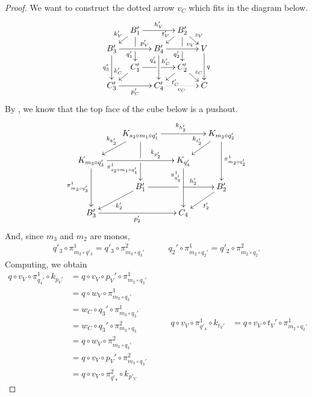 \documentclass[a4paper,UKenglish,cleveref,pdftex,thm-restate,numberwithinsect]{lipics-v2021}
\def\B{\textbf {\textup{B}}}
\begin{document}
\begin{proof}
	We want to construct the dotted arrow $v_C$ which fits in the diagram below.
	\[
	\xymatrix@C=10pt@R=6pt{
		&B_1'\ar[dd]|\hole_(.65){q_1'}\ar[rr]^{h_V'} \ar[dl]_{k_V'} && B_2' \ar[dd]|\hole_(.65){q_2'} \ar[dl]_{t_V'}\ar[dr]^{z_V}\\
		B_3'  \ar[dd]_{q_3'}\ar[rr]^(.7){p_V'} & & B_4' \ar[dd]_(.3){q_4'} \ar[rr]^(.7){v_V}&&  V\ar[dd]^{q}\\
		&C_1'\ar[rr]|\hole^(.65){h_C'} \ar[dl]_{k_C'} && C_2' \ar[dl]^{t_C'}\ar[dr]^{z_C}\\
		C'_3 \ar[rr]_{p_C'} & & C'_4\ar@{.>}[rr]_{v_C} && C
	}\]
	By , we know that the top face of the cube below is a pushout.
	\[\xymatrix@C=15pt@R=15pt{&K_{s_2\circ m_1\circ q'_1}\ar[dd]|\hole_(.65){\pi_{s_2\circ m_1\circ q'_1}^{1}}\ar[rr]^{k_{h'_2}} \ar[dl]_{k_{k'_2}} && K_{m_2\circ q'_2} \ar[dd]^{\pi_{m_2\circ q'_2}^{1}} \ar[dl]_{k_{t'_2}} \\ K_{m_3\circ q'_3}  \ar[dd]_{\pi_{m_3\circ q'_3}^{1}}\ar[rr]^(.7){k_{p'_2}} & & K_{q'_4} \ar[dd]_(.3){\pi_{q'_4}^{1}}\\&B'_1\ar[rr]|\hole^(.65){h'_2} \ar[dl]^{k'_2} && B'_2 \ar[dl]^{t'_2} \\B'_3 \ar[rr]_{p'_2} & & C_4}\]
	And, since $m_3$ and $m_2$ are monos,
	\[\begin{split}
		q'_3 \circ \pi_{m_3 \circ q'_3}^1 = q'_3 \circ \pi_{m_3\circ q_3'}^2
	\end{split}\qquad\begin{split}
		q_2' \circ \pi_{m_2 \circ q_2'}^1 = q'_2 \circ \pi_{m_2 \circ q_2'}^2
	\end{split}\]
	Computing, we obtain
	\[\begin{split}
		q \circ v_V \circ \pi_{q_4'}^1 \circ k_{p_V'} &= q \circ v_V \circ p_V' \circ \pi_{m_3 \circ q_3'}^1 \\
		&= q \circ w_V \circ \pi_{m_3 \circ q_3'}^1 \\
		&= w_C \circ q_3' \circ \pi_{m_3 \circ q_3'}^1 \\
		&= w_C \circ q_3' \circ \pi_{m_3 \circ q_3}^2 \\
		&= q \circ w_V \circ \pi_{m_3 \circ q_3'}^2 \\
		&= q \circ v_V \circ p_V' \circ \pi_{m_3 \circ q_3'}^2 \\
		&= q \circ v_V \circ \pi_{q'_4}^2 \circ k_{p'_V}
	\end{split}\qquad\begin{split}
		q \circ v_V \circ \pi_{q'_4}^1 \circ k_{t_V'} &= q \circ v_V \circ t_V' \circ \pi_{m_2 \circ q_2'}^1 \\

\end{split}\]
\end{proof}
\end{document}
